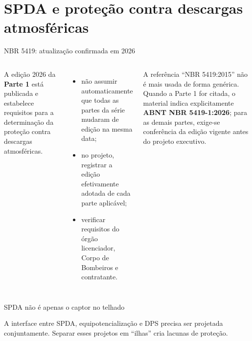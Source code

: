 \section{SPDA e proteção contra descargas atmosféricas}

\begin{frame}{NBR 5419: atualização confirmada em 2026}
\small
\begin{columns}[T,onlytextwidth]
\begin{caixaNorma}[title=ABNT NBR 5419-1:2026]
A edição 2026 da \textbf{Parte 1} está publicada e estabelece requisitos para a determinação da proteção contra descargas atmosféricas.
\end{caixaNorma}
\begin{itemize}
\item não assumir automaticamente que todas as partes da série mudaram de edição na mesma data;
\item no projeto, registrar a edição efetivamente adotada de cada parte aplicável;
\item verificar requisitos do órgão licenciador, Corpo de Bombeiros e contratante.
\end{itemize}
\begin{caixaAt}[title=Regra para este material]
A referência ``NBR 5419:2015'' não é mais usada de forma genérica. Quando a Parte 1 for citada, o material indica explicitamente \textbf{ABNT NBR 5419-1:2026}; para as demais partes, exige-se conferência da edição vigente antes do projeto executivo.
\end{caixaAt}
\end{columns}
\end{frame}

\begin{frame}{SPDA não é apenas o captor no telhado}
\small
\centering
{}
\vspace{2mm}
\begin{caixaObs}
A interface entre SPDA, equipotencialização e DPS precisa ser projetada conjuntamente. Separar esses projetos em ``ilhas'' cria lacunas de proteção.
\end{caixaObs}
\end{frame}

